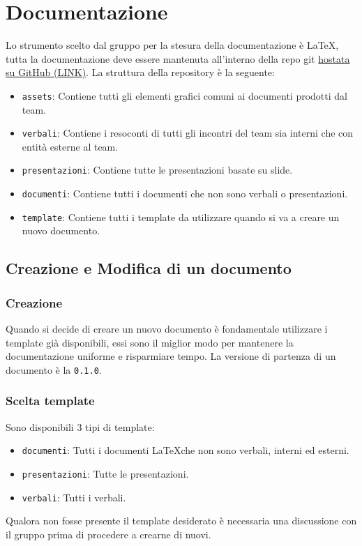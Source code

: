 \section{Documentazione}

Lo strumento scelto dal gruppo per la stesura della documentazione è \LaTeX,
tutta la documentazione deve essere mantenuta all'interno della repo git
\href{https://github.com/Club-Swendwich/Documenti}{hostata su GitHub (LINK)}.
La struttura della repository è la seguente:
\begin{itemize}
    \item \texttt{assets}: Contiene tutti gli elementi grafici comuni ai documenti
        prodotti dal team.
    \item \texttt{verbali}: Contiene i resoconti di tutti gli incontri del team sia
        interni che con entità esterne al team.
    \item \texttt{presentazioni}: Contiene tutte le presentazioni basate su slide.
    \item \texttt{documenti}: Contiene tutti i documenti che non sono verbali o
        presentazioni.
    \item \texttt{template}: Contiene tutti i template da utilizzare quando si va a
        creare un nuovo documento.
\end{itemize}

\subsection{Creazione e Modifica di un documento}

\subsubsection{Creazione}
Quando si decide di creare un nuovo documento è fondamentale utilizzare i template già
disponibili, essi sono il miglior modo per mantenere la documentazione uniforme e
risparmiare tempo.
La versione di partenza di un documento è la \texttt{0.1.0}.

\subsubsection{Scelta template}

Sono disponibili 3 tipi di template:
\begin{itemize}
    \item \texttt{documenti}: Tutti i documenti \LaTeX che non sono verbali, interni ed esterni.
    \item \texttt{presentazioni}: Tutte le presentazioni.
    \item \texttt{verbali}: Tutti i verbali.
\end{itemize}
Qualora non fosse presente il template desiderato è necessaria una discussione con il gruppo prima di procedere a crearne di nuovi.

